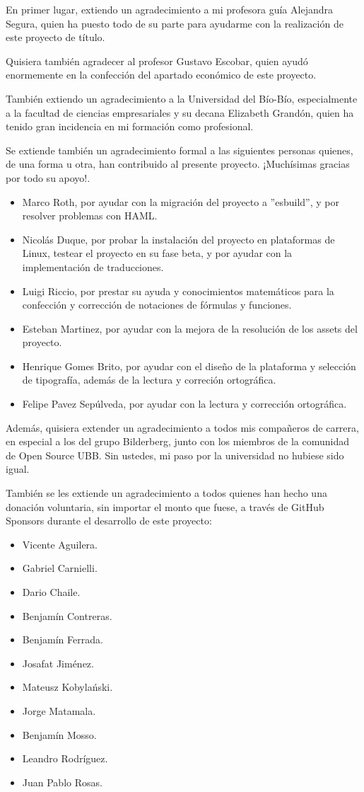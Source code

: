 En primer lugar, extiendo un agradecimiento a mi profesora guía Alejandra Segura, quien ha puesto todo de su parte para ayudarme con la realización de este proyecto de título.

Quisiera también agradecer al profesor Gustavo Escobar, quien ayudó enormemente en la confección del apartado económico de este proyecto.

También extiendo un agradecimiento a la Universidad del Bío-Bío, especialmente a la facultad de ciencias empresariales y su decana Elizabeth Grandón, quien ha tenido gran incidencia en mi formación como profesional.

Se extiende también un agradecimiento formal a las siguientes personas quienes, de una forma u otra, han contribuido al presente proyecto. ¡Muchísimas gracias por todo su apoyo!.

\begin{itemize}
	\item Marco Roth, por ayudar con la migración del proyecto a ''esbuild'', y por resolver problemas con HAML.
	\item Nicolás Duque, por probar la instalación del proyecto en plataformas de Linux, testear el proyecto en su fase beta, y por ayudar con la implementación de traducciones.
	\item Luigi Riccio, por prestar su ayuda y conocimientos matemáticos para la confección y corrección de notaciones de fórmulas y funciones. 
	\item Esteban Martinez, por ayudar con la mejora de la resolución de los assets del proyecto.
	\item Henrique Gomes Brito, por ayudar con el diseño de la plataforma y selección de tipografía, además de la lectura y correción ortográfica.
  \item Felipe Pavez Sepúlveda, por ayudar con la lectura y corrección ortográfica.
\end{itemize}

Además, quisiera extender un agradecimiento a todos mis compañeros de carrera, en especial a los del grupo Bilderberg, junto con los miembros de la comunidad de Open Source UBB. Sin ustedes, mi paso por la universidad no hubiese sido igual.

También se les extiende un agradecimiento a todos quienes han hecho una donación voluntaria, sin importar el monto que fuese, a través de GitHub Sponsors durante el desarrollo de este proyecto:
\begin{itemize}
  \item Vicente Aguilera.
  \item Gabriel Carnielli.
  \item Dario Chaile.
  \item Benjamín Contreras.
  \item Benjamín Ferrada.
  \item Josafat Jiménez.
  \item  Mateusz Kobylański.
  \item Jorge Matamala.
  \item Benjamín Mosso.
  \item Leandro Rodríguez.
  \item Juan Pablo Rosas.
\end{itemize}
